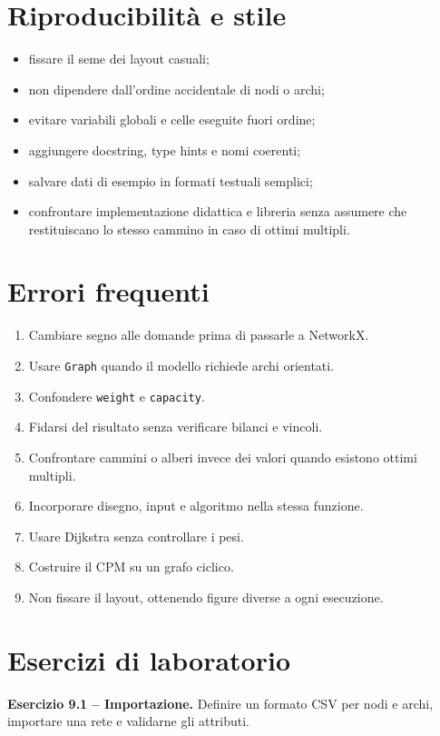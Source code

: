 \documentclass[11pt,a4paper]{article}
\begin{document}
\section{Riproducibilità e stile}
\begin{itemize}
\item fissare il seme dei layout casuali;
\item non dipendere dall'ordine accidentale di nodi o archi;
\item evitare variabili globali e celle eseguite fuori ordine;
\item aggiungere docstring, type hints e nomi coerenti;
\item salvare dati di esempio in formati testuali semplici;
\item confrontare implementazione didattica e libreria senza assumere che restituiscano lo stesso cammino in caso di ottimi multipli.
\end{itemize}

\section{Errori frequenti}
\begin{enumerate}
\item Cambiare segno alle domande prima di passarle a NetworkX.
\item Usare \texttt{Graph} quando il modello richiede archi orientati.
\item Confondere \texttt{weight} e \texttt{capacity}.
\item Fidarsi del risultato senza verificare bilanci e vincoli.
\item Confrontare cammini o alberi invece dei valori quando esistono ottimi multipli.
\item Incorporare disegno, input e algoritmo nella stessa funzione.
\item Usare Dijkstra senza controllare i pesi.
\item Costruire il CPM su un grafo ciclico.
\item Non fissare il layout, ottenendo figure diverse a ogni esecuzione.
\end{enumerate}

\section{Esercizi di laboratorio}
\textbf{Esercizio 9.1 -- Importazione.} Definire un formato CSV per nodi e archi, importare una rete e validarne gli attributi.
\end{document}
